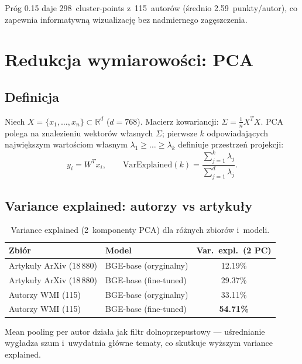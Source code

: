 \documentclass[a4paper,11pt]{article}
\begin{document}
Próg 0.15 daje 298~cluster-points z~115~autorów (średnio 2.59~punkty/autor), co zapewnia informatywną wizualizację bez nadmiernego zagęszczenia.


\section{Redukcja wymiarowości: PCA}
\label{sec:pca}

\subsection{Definicja}

Niech $X = \{x_1, \ldots, x_n\} \subset \mathbb{R}^d$ ($d{=}768$).
Macierz kowariancji: $\Sigma = \frac{1}{n} X^T X$.
PCA polega na znalezieniu wektorów własnych $\Sigma$; pierwsze $k$ odpowiadających największym wartościom własnym $\lambda_1 \geq \ldots \geq \lambda_k$ definiuje przestrzeń projekcji:
\begin{equation}
y_i = W^T x_i, \qquad
\text{VarExplained}(k) = \frac{\sum_{j=1}^k \lambda_j}{\sum_{j=1}^d \lambda_j}.
\end{equation}

\subsection{Variance explained: autorzy vs artykuły}

\begin{table}[H]
\centering
\caption{Variance explained (2~komponenty PCA) dla różnych zbiorów i~modeli.}
\label{tab:variance}
\begin{tabular}{llc}
\toprule
Zbiór & Model & Var.\ expl.\ (2 PC) \\
\midrule
Artykuły ArXiv (18\,880) & BGE-base (oryginalny) & 12.19\% \\
Artykuły ArXiv (18\,880) & BGE-base (fine-tuned) & 29.37\% \\
Autorzy WMI (115) & BGE-base (oryginalny) & 33.11\% \\
Autorzy WMI (115) & BGE-base (fine-tuned) & \textbf{54.71\%} \\
\bottomrule
\end{tabular}
\end{table}

Mean pooling per autor działa jak filtr dolnoprzepustowy --- uśrednianie wygładza szum i~uwydatnia główne tematy, co skutkuje wyższym variance explained.
\end{document}
